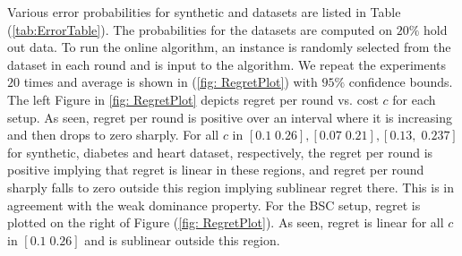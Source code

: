 Various error probabilities for synthetic and datasets are listed in Table (\ref{tab:ErrorTable}).  
The probabilities for the datasets are computed on $20 \%$ hold out data. To run the online algorithm, an instance is randomly selected from the dataset in each round and is input to the  algorithm. We repeat the experiments $20$ times and average is shown in (\ref{fig: RegretPlot}) with $95\%$ confidence bounds. The left Figure in \ref{fig: RegretPlot} depicts regret per round vs. cost $c$ for each setup. As seen, regret per round is positive over an interval where it is increasing and then drops to zero sharply. For all $c$ in $[0.1\; 0.26], [0.07\; 0.21], [0.13, \; 0.237]$ for synthetic, diabetes and heart dataset, respectively, the regret per round is positive implying that regret is linear in these regions, and regret per round  sharply falls to zero outside this region implying sublinear regret there. This is in agreement with the weak dominance property. For the BSC setup, regret is plotted on the right of Figure  (\ref{fig: RegretPlot}). As seen, regret is linear for all $c$ in    $[0.1\; 0.26]$ and is sublinear outside this region. 
